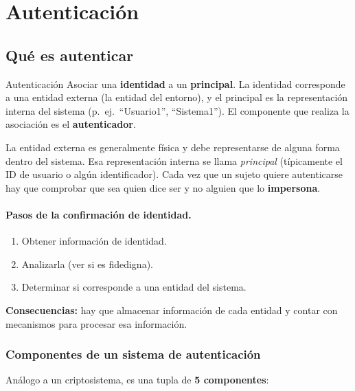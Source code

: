 \documentclass[../main.tex]{subfiles}
\begin{document}
\section{Autenticación}

\subsection{Qué es autenticar}

\begin{definicion}{Autenticación}
Asociar una \textbf{identidad} a un \textbf{principal}. La identidad corresponde a una entidad externa (la entidad del entorno), y el principal es la representación interna del sistema (p.\ ej.\ ``Usuario1'', ``Sistema1''). El componente que realiza la asociación es el \textbf{autenticador}.
\end{definicion}

La entidad externa es generalmente física y debe representarse de alguna forma dentro del sistema. Esa representación interna se llama \emph{principal} (típicamente el ID de usuario o algún identificador). Cada vez que un sujeto quiere autenticarse hay que comprobar que sea quien dice ser y no alguien que lo \textbf{impersona}.

\paragraph{Pasos de la confirmación de identidad.}
\begin{enumerate}[itemsep=1pt]
  \item Obtener información de identidad.
  \item Analizarla (ver si es fidedigna).
  \item Determinar si corresponde a una entidad del sistema.
\end{enumerate}
\textbf{Consecuencias:} hay que almacenar información de cada entidad y contar con mecanismos para procesar esa información.

\subsubsection{Componentes de un sistema de autenticación}

Análogo a un criptosistema, es una tupla de \textbf{5 componentes}:
\end{document}
